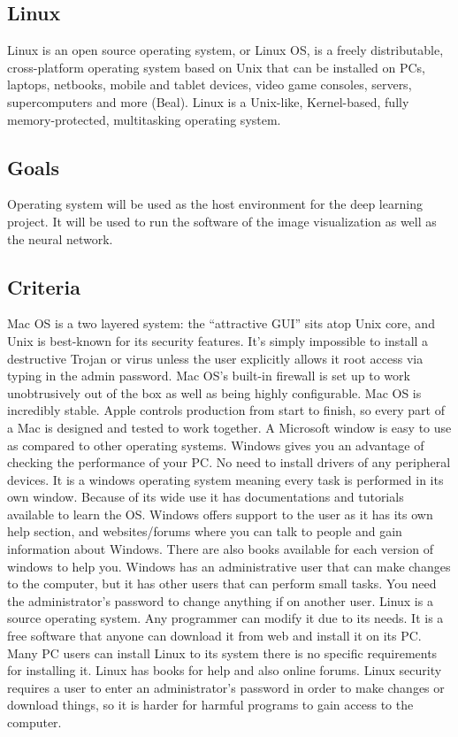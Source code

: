\documentclass{scrreprt}
\begin{document}
\subsection{Linux}
Linux is an open source operating system, or Linux OS, is a freely distributable, cross-platform operating
system based on Unix that can be installed on PCs, laptops, netbooks, mobile and tablet devices, video
game consoles, servers, supercomputers and more (Beal). Linux is a Unix-like, Kernel-based, fully
memory-protected, multitasking operating system.

\subsection{Goals}
Operating system will be used as the host environment for the deep learning project.
It will be used to run the software of the image visualization as well as the neural network.

\subsection{Criteria}
Mac OS is a two layered system: the “attractive GUI” sits atop Unix core, and Unix is best-known for its
security features. It’s simply impossible to install a destructive Trojan or virus unless the user explicitly
allows it root access via typing in the admin password. Mac OS’s built-in firewall is set up to work
unobtrusively out of the box as well as being highly configurable. Mac OS is incredibly stable. Apple
controls production from start to finish, so every part of a Mac is designed and tested to work together.
\newline
\newline
A Microsoft window is easy to use as compared to other operating systems. Windows gives you an
advantage of checking the performance of your PC. No need to install drivers of any peripheral devices.
It is a windows operating system meaning every task is performed in its own window. Because of its
wide use it has documentations and tutorials available to learn the OS. Windows offers support to the
user as it has its own help section, and websites/forums where you can talk to people and gain
information about Windows. There are also books available for each version of windows to help you.
Windows has an administrative user that can make changes to the computer, but it has other users that
can perform small tasks. You need the administrator’s password to change anything if on another user.
\newline
\newline
Linux is a source operating system. Any programmer can modify it due to its needs. It is a free software
that anyone can download it from web and install it on its PC. Many PC users can install Linux to its
system there is no specific requirements for installing it. Linux has books for help and also online forums.
Linux security requires a user to enter an administrator’s password in order to make changes or
download things, so it is harder for harmful programs to gain access to the computer.
\end{document}
